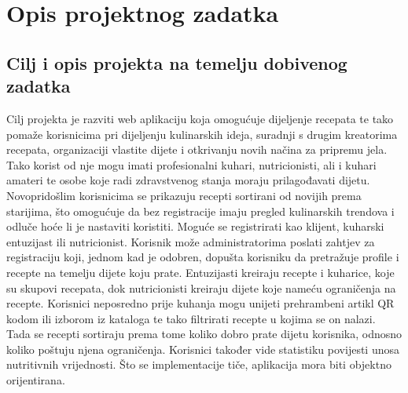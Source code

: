 \chapter{Opis projektnog zadatka}
		

	\section{Cilj i opis projekta na temelju dobivenog zadatka}	
	Cilj projekta je razviti web aplikaciju koja omogućuje dijeljenje recepata te tako pomaže korisnicima pri dijeljenju kulinarskih ideja, suradnji s drugim kreatorima recepata, organizaciji vlastite dijete i otkrivanju novih načina za pripremu jela. Tako korist od nje mogu imati profesionalni kuhari, nutricionisti, ali i kuhari amateri te osobe koje radi zdravstvenog stanja moraju prilagođavati dijetu. Novopridošlim korisnicima se prikazuju recepti sortirani od novijih prema starijima, što omogućuje da bez registracije imaju pregled kulinarskih trendova i odluče hoće li je nastaviti koristiti. Moguće se registrirati kao klijent, kuharski entuzijast ili nutricionist. Korisnik može administratorima poslati zahtjev za registraciju koji, jednom kad je odobren, dopušta korisniku da pretražuje profile i recepte na temelju dijete koju prate. Entuzijasti kreiraju recepte i kuharice, koje su skupovi recepata, dok nutricionisti kreiraju dijete koje nameću ograničenja na recepte. Korisnici neposredno prije kuhanja mogu unijeti prehrambeni artikl QR kodom ili izborom iz kataloga te tako filtrirati recepte u kojima se on nalazi. Tada se recepti sortiraju prema tome koliko dobro prate dijetu korisnika, odnosno koliko poštuju njena ograničenja. Korisnici također vide statistiku povijesti unosa nutritivnih vrijednosti. Što se implementacije tiče, aplikacija mora biti objektno orijentirana.


